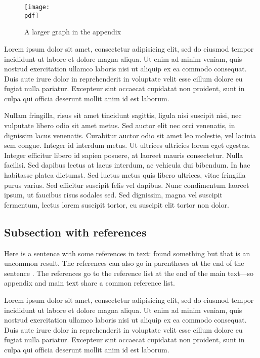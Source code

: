\documentclass[letterpaper,11pt,leqno]{article}
\newcommand{\pdf}{figures.pdf}
\begin{document}
\begin{figure}[t]
\texttt{[image: \\pdf]}
\caption{A larger graph in the appendix}
\label{f:appendix1}\end{figure}

Lorem ipsum dolor sit amet, consectetur adipisicing elit, sed do eiusmod
tempor incididunt ut labore et dolore magna aliqua. Ut enim ad minim veniam,
quis nostrud exercitation ullamco laboris nisi ut aliquip ex ea commodo
consequat. Duis aute irure dolor in reprehenderit in voluptate velit esse
cillum dolore eu fugiat nulla pariatur. Excepteur sint occaecat cupidatat non
proident, sunt in culpa qui officia deserunt mollit anim id est laborum.

Nullam fringilla, risus sit amet tincidunt sagittis, ligula nisi suscipit nisi, nec vulputate libero odio sit amet metus. Sed auctor elit nec orci venenatis, in dignissim lacus venenatis. Curabitur auctor odio sit amet leo molestie, vel lacinia sem congue. Integer id interdum metus. Ut ultrices ultricies lorem eget egestas. Integer efficitur libero id sapien posuere, at laoreet mauris consectetur. Nulla facilisi. Sed dapibus lectus at lacus interdum, ac vehicula dui bibendum. In hac habitasse platea dictumst. Sed luctus metus quis libero ultrices, vitae fringilla purus varius. Sed efficitur suscipit felis vel dapibus. Nunc condimentum laoreet ipsum, ut faucibus risus sodales sed. Sed dignissim, magna vel suscipit fermentum, lectus lorem suscipit tortor, eu suscipit elit tortor non dolor. 

\subsection{Subsection with references}\label{a:subappendix}

Here is a sentence with some references in text: \citet{MS19,MS21b} found something but that is an uncommon result. The references can also go in parentheses at the end of the sentence \citep{MS23,MS21a}. The references go to the reference list at the end of the main text---so appendix and main text share a common reference list.

Lorem ipsum dolor sit amet, consectetur adipisicing elit, sed do eiusmod
tempor incididunt ut labore et dolore magna aliqua. Ut enim ad minim veniam,
quis nostrud exercitation ullamco laboris nisi ut aliquip ex ea commodo
consequat. Duis aute irure dolor in reprehenderit in voluptate velit esse
cillum dolore eu fugiat nulla pariatur. Excepteur sint occaecat cupidatat non
proident, sunt in culpa qui officia deserunt mollit anim id est laborum.
\end{document}
